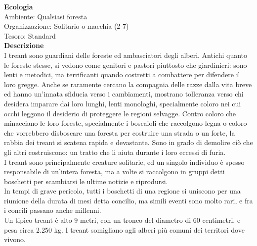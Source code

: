 \begin{multicols}{2}
\textbf{Ecologia}\\
Ambiente: Qualsiasi foresta\\
Organizzazione: Solitario o macchia (2-7)\\
Tesoro: Standard\\
\textbf{Descrizione}\\
I treant sono guardiani delle foreste ed ambasciatori degli alberi. Antichi quanto le foreste stesse, si vedono come genitori e pastori piuttosto che giardinieri: sono lenti e metodici, ma terrificanti quando costretti a combattere per difendere il loro gregge. Anche se raramente cercano la compagnia delle razze dalla vita breve ed hanno un'innata sfiducia verso i cambiamenti, mostrano tolleranza verso chi desidera imparare dai loro lunghi, lenti monologhi, specialmente coloro nei cui occhi leggono il desiderio di proteggere le regioni selvagge. Contro coloro che minacciano le loro foreste, specialmente i boscaioli che raccolgono legna o coloro che vorrebbero disboscare una foresta per costruire una strada o un forte, la rabbia dei treant si scatena rapida e devastante. Sono in grado di demolire ciò che gli altri costruiscono: un tratto che li aiuta durante i loro eccessi di furia.\\

I treant sono principalmente creature solitarie, ed un singolo individuo è spesso responsabile di un'intera foresta, ma a volte si raccolgono in gruppi detti boschetti per scambiarsi le ultime notizie e riprodursi.\\

In tempi di grave pericolo, tutti i boschetti di una regione si uniscono per una riunione della durata di mesi detta concilio, ma simili eventi sono molto rari, e fra i concili passano anche millenni.\\

Un tipico treant è alto 9 metri, con un tronco del diametro di 60 centimetri, e pesa circa 2.250 kg. I treant somigliano agli alberi più comuni dei territori dove vivono.\\


\end{multicols}
